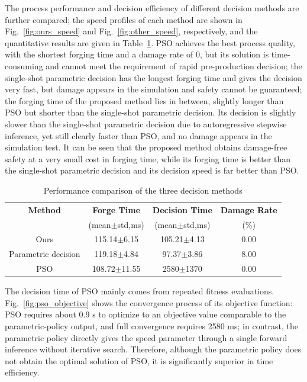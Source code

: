 The process performance and decision efficiency of different decision methods are further compared; the speed profiles of each method are shown in Fig.~\ref{fig:ours_speed} and Fig.~\ref{fig:other_speed}, respectively, and the quantitative results are given in Table~\ref{tab:Method Comparison}. PSO achieves the best process quality, with the shortest forging time and a damage rate of 0, but its solution is time-consuming and cannot meet the requirement of rapid pre-production decision; the single-shot parametric decision has the longest forging time and gives the decision very fast, but damage appears in the simulation and safety cannot be guaranteed; the forging time of the proposed method lies in between, slightly longer than PSO but shorter than the single-shot parametric decision. Its decision is slightly slower than the single-shot parametric decision due to autoregressive stepwise inference, yet still clearly faster than PSO, and no damage appears in the simulation test. It can be seen that the proposed method obtains damage-free safety at a very small cost in forging time, while its forging time is better than the single-shot parametric decision and its decision speed is far better than PSO.

\begin{table}[H]
\centering
\caption{Performance comparison of the three decision methods}
\setlength{\tabcolsep}{3.5pt}
\begin{tabular}{c c c c}
\toprule
\textbf{Method} & \textbf{Forge Time} & \textbf{Decision Time} & \textbf{Damage Rate}\\
& (mean$\pm$std,ms) & (mean$\pm$std,ms) & (\%)\\
\midrule
Ours & 115.14$\pm$6.15 & 105.21$\pm$4.13 & 0.00 \\
Parametric decision & 119.18$\pm$4.84 & 97.37$\pm$3.86 & 8.00 \\
PSO        & 108.72$\pm$11.55 & 2580$\pm$1370 & 0.00 \\
\bottomrule
\end{tabular}
\label{tab:Method Comparison}
\end{table}

The decision time of PSO mainly comes from repeated fitness evaluations. Fig.~\ref{fig:pso_objective} shows the convergence process of its objective function: PSO requires about 0.9 s to optimize to an objective value comparable to the parametric-policy output, and full convergence requires 2580 ms; in contrast, the parametric policy directly gives the speed parameter through a single forward inference without iterative search. Therefore, although the parametric policy does not obtain the optimal solution of PSO, it is significantly superior in time efficiency.

